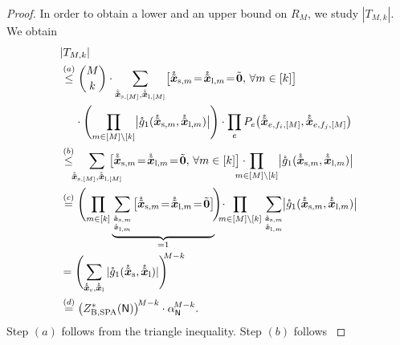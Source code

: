 \documentclass[journal]{IEEEtran}
\newcommand{\add}[1]{{\color{black}#1}}
\newcommand{\vect}[1]{ \bm{#1} }
\newcommand{\graphN}{ \mathsf{N} }
\newcommand{\ZBSPA}{ Z_{\mathrm{B,SPA}} }
\newcommand{\LCTtv}[1]{ \mathring{ \tilde{ \vect{#1} } } }
\newcommand{\LCT}[1]{ \mathring{#1} }
\newcommand{\efi}{ e,f_i }
\newcommand{\efj}{ e,f_j }
\newcommand{\LCTvxl}{ \LCTtv{x}_{\mathrm{l}} }
\newcommand{\LCTvxs}{ \LCTtv{x}_{\mathrm{s}} }
\newcommand{\LCTvxlm}{ \LCTtv{x}_{\mathrm{l},m} }
\newcommand{\LCTvxsm}{ \LCTtv{x}_{\mathrm{s},m} }
\newcommand{\LCTvxlM}{ \LCTtv{x}_{\mathrm{l},[M]} }
\newcommand{\LCTvxsM}{ \LCTtv{x}_{\mathrm{s},[M]} }
\newcommand{\gone}{\LCT{g}_{1}}
\newcommand{\tv}[1]{ \tilde{\vect{#1}} }
\begin{document}
\begin{appendices}
\begin{proof}
{      In order to obtain a lower and an upper bound on $R_M$, we study
      $|T_{M,k}|$. We obtain
      \begin{align}
         & |T_{M,k}|                                                                                   \\
         & \overset{(a)}{\leq}
        \binom{M}{k}
        \cdot
        \sum_{ \LCTvxsM, \LCTvxlM }
        \bigl[ \LCTvxsm \! = \! \LCTvxlm \! = \! \tv{0},\, \forall m \in [k] \bigr]
        \nonumber
        \\
         & \quad\ \cdot
        \Biggl(
        \prod_{ m \in [M] \setminus [k] }
        \bigl| \gone( \LCTvxsm, \LCTvxlm ) \bigr|
        \Biggr)
        \cdot
        \prod_{e} P_{e}\bigl( \LCTtv{x}_{\efi,[M]}, \LCTtv{x}_{\efj,[M]} \bigr)
        \nonumber                                                                                      \\
         & \overset{(b)}{\leq} \!\!\!
        \sum_{ \LCTvxsM, \LCTvxlM } \!\!\!\!\!\!\! \bigl[ \LCTvxsm
                                                     \! = \! \LCTvxlm  \! = \! \tv{0},\, \forall m \in [k] \bigr] \cdot
        \!\!\!\!\!\!\!
        \prod_{ m \in [M] \setminus [k] } \bigl| \gone( \LCTvxsm, \LCTvxlm ) \bigr|
        \nonumber                                                                                      \\
         & \overset{(c)}{=}
        \Biggl( \prod\limits_{m \in [k]} \underbrace{\sum\limits_{ \LCTvxsm
                                             \atop \LCTvxlm } \bigl[ \LCTvxsm \! = \! \LCTvxlm \! = \! \tv{0}
                                             \bigr]}_{=1} \! \Biggr)
        \! \cdot \!\!\!\!\! \prod\limits_{m \in [M] \setminus [k] } \sum\limits_{ \LCTvxsm
                                                                          \atop \LCTvxlm } \! \bigl| \gone( \LCTvxsm, \LCTvxlm ) \bigr|
        \nonumber                                                                                      \\
         & = \Biggl( \sum\limits_{ \LCTvxs, \LCTvxl } |\gone( \LCTvxs, \LCTvxl )| \Biggr)^{\!\!\! M-k}
        \nonumber                                                                                      \\
         &
        \overset{(d)}{=}
        \bigl( \ZBSPA^{*}( \graphN) \bigr)^{\! M-k}
        \cdot
        \alpha_{\graphN}^{\!M-k}.
        \label{sec:CheckCon:eqn:T-def}
      \end{align}
    }%
    \add{Step $(a)$ follows from the triangle inequality. Step $(b)$ follows
}
\end{proof}
\end{appendices}
\end{document}
